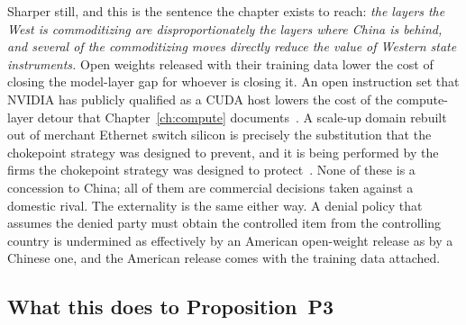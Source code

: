 Sharper still, and this is the sentence the chapter exists to reach: \emph{the layers the West is commoditizing are disproportionately the layers where China is behind, and several of the commoditizing moves directly reduce the value of Western state instruments.} Open weights released with their training data lower the cost of closing the model-layer gap for whoever is closing it. An open instruction set that NVIDIA has publicly qualified as a CUDA host lowers the cost of the compute-layer detour that Chapter~\ref{ch:compute} documents~\cite{hc2026-nv-riscv}. A scale-up domain rebuilt out of merchant Ethernet switch silicon is precisely the substitution that the chokepoint strategy was designed to prevent, and it is being performed by the firms the chokepoint strategy was designed to protect~\cite{hc2026-scaleup}. None of these is a concession to China; all of them are commercial decisions taken against a domestic rival. The externality is the same either way. A denial policy that assumes the denied party must obtain the controlled item from the controlling country is undermined as effectively by an American open-weight release as by a Chinese one, and the American release comes with the training data attached.

\subsection{What this does to Proposition~P3}

